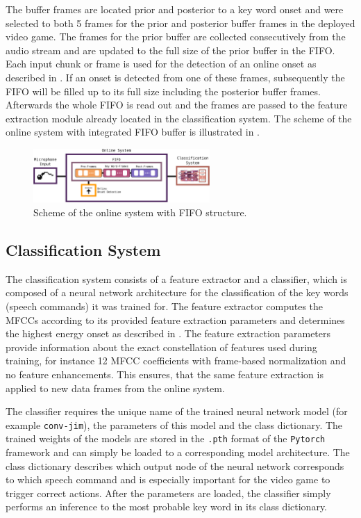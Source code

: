 The buffer frames are located prior and posterior to a key word onset and were selected to both 5 frames for the prior and posterior buffer frames in the deployed video game.
The frames for the prior buffer are collected consecutively from the audio stream and are updated to the full size of the prior buffer in the FIFO. 
Each input chunk or frame is used for the detection of an online onset as described in .
If an onset is detected from one of these frames, subsequently the FIFO will be filled up to its full size including the posterior buffer frames.
Afterwards the whole FIFO is read out and the frames are passed to the feature extraction module already located in the classification system.
The scheme of the online system with integrated FIFO buffer is illustrated in .
\begin{figure}[!ht]
  \centering
  \includegraphics[width=0.60\textwidth]{./6_game/figs/game_system_online}
  \caption{Scheme of the online system with FIFO structure.}
  \label{fig:game_system_online}
\end{figure}
\FloatBarrier
\noindent



\subsection{Classification System}
The classification system consists of a feature extractor and a classifier, which is composed of a neural network architecture for the classification of the key words (speech commands) it was trained for.
The feature extractor computes the MFCCs according to its provided feature extraction parameters and determines the highest energy onset as described in .
The feature extraction parameters provide information about the exact constellation of features used during training, for instance 12 MFCC coefficients with frame-based normalization and no feature enhancements.
This ensures, that the same feature extraction is applied to new data frames from the online system.

The classifier requires the unique name of the trained neural network model (for example \texttt{conv-jim}), the parameters of this model and the class dictionary.
The trained weights of the  models are stored in the \texttt{.pth} format of the \texttt{Pytorch} framework and can simply be loaded to a corresponding model architecture.
The class dictionary describes which output node of the neural network corresponds to which speech command and is especially important for the video game to trigger correct actions.
After the parameters are loaded, the classifier simply performs an inference to the most probable key word in its class dictionary.

